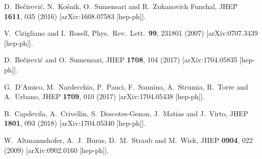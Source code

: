 \documentclass[aps,prd,superscriptaddress,twocolumn,secnumarabic]{revtex4-1}
\begin{document}
\begin{thebibliography}{99}
  D.~Bečirević, N.~Košnik, O.~Sumensari and R.~Zukanovich Funchal,
  JHEP {\bf 1611}, 035 (2016)
  [arXiv:1608.07583 [hep-ph]].


  V.~Cirigliano and I.~Rosell,
  Phys.\ Rev.\ Lett.\  {\bf 99}, 231801 (2007)
  [arXiv:0707.3439 [hep-ph]].


  D.~Bečirević and O.~Sumensari,
  JHEP {\bf 1708}, 104 (2017)
  [arXiv:1704.05835 [hep-ph]].


  G.~D'Amico, M.~Nardecchia, P.~Panci, F.~Sannino, A.~Strumia, R.~Torre and A.~Urbano,
  JHEP {\bf 1709}, 010 (2017)
  [arXiv:1704.05438 [hep-ph]].


  B.~Capdevila, A.~Crivellin, S.~Descotes-Genon, J.~Matias and J.~Virto,
  JHEP {\bf 1801}, 093 (2018)
  [arXiv:1704.05340 [hep-ph]].


  W.~Altmannshofer, A.~J.~Buras, D.~M.~Straub and M.~Wick,
  JHEP {\bf 0904}, 022 (2009)
  [arXiv:0902.0160 [hep-ph]].



\end{thebibliography}
\end{document}
